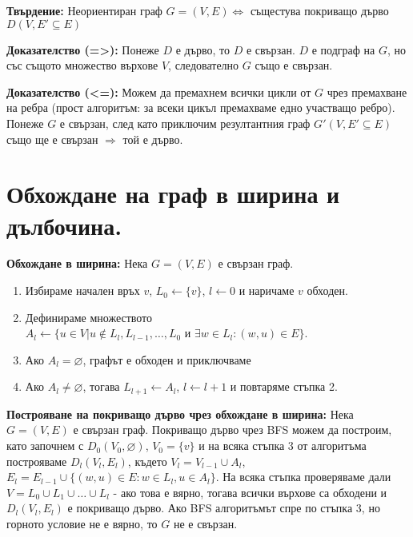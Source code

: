 \documentclass[fleqn,12pt]{article}
\begin{document}
\begin{flushleft}
\textbf{Твърдение:} Неориентиран граф $G = (V, E) \Leftrightarrow $ същестува покриващо дърво $D(V, E' \subseteq E)$ 

\textbf{Доказателство (=>):} Понеже $D$ е дърво, то $D$ е свързан. $D$ е подграф на $G$, но със същото множество върхове $V$, следователно $G$ също е свързан.

\textbf{Доказателство (<=):} Можем да премахнем всички цикли от $G$ чрез премахване на ребра (прост алгоритъм: за всеки цикъл премахваме едно участващо ребро).
Понеже $G$ е свързан, след като приключим резултантния граф $G'(V, E' \subseteq E)$ също ще е свързан $\Rightarrow$ той е дърво.

\section{Обхождане на граф в ширина и дълбочина.}

\textbf{Обхождане в ширина: } Нека $G = (V, E)$ е свързан граф. 
\begin{enumerate}
	\item Избираме начален връх $v$, $L_0 \leftarrow \{ v \}$, $l \leftarrow 0$ и наричаме $v$ обходен.
	\item Дефинираме множеството $A_l \leftarrow \{ u \in V | u \notin L_l, L_{l-1}, \dots, L_0 \text{ и } \exists w \in L_l : (w, u) \in E \}$.
	\item Ако $A_l = \varnothing$, графът е обходен и приключваме
	\item Ако $A_l \neq \varnothing$, тогава $L_{l+1} \leftarrow A_l$, $ l \leftarrow l + 1$ и повтаряме стъпка 2.
\end{enumerate}

\textbf{Построяване на покриващо дърво чрез обхождане в ширина: } Нека $G = (V, E)$ е свързан граф.
Покриващо дърво чрез BFS можем да построим, като започнем с $D_0(V_0, \varnothing)$, $V_0 = \{ v \}$ и на всяка стъпка 3 
от алгоритъма построяваме $D_l(V_l, E_l)$, където $V_l = V_{l - 1} \cup A_l$, 
$E_l = E_{l - 1} \cup \{ (w, u) \in E : w \in L_l, u \in A_l \}$. На всяка стъпка проверяваме дали 
$V = L_0 \cup L_1 \cup \dots \cup L_l$ - ако това е вярно, тогава всички върхове са обходени и $D_l(V_l, E_l)$ е покриващо дърво.
Ако BFS алгоритъмът спре по стъпка 3, но горното условие не е вярно, то $G$ не е свързан.
\vspace{10mm}


\end{flushleft}
\end{document}
